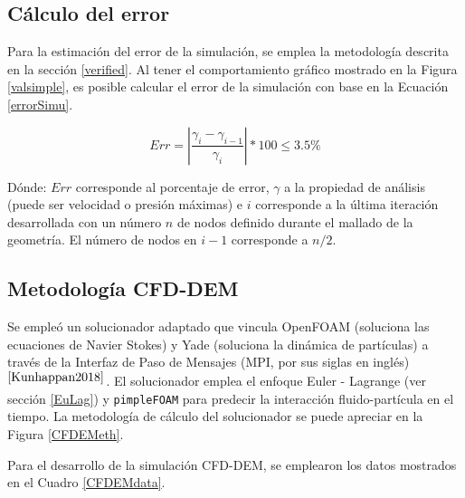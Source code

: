 



\subsection{C\'alculo del error} \label{SimuErr}

\noindent
\justify

Para la estimaci\'on del error de la simulaci\'on, se emplea la metodolog\'ia descrita en la secci\'on \ref{verified}. Al tener el comportamiento gr\'afico mostrado en la Figura \ref{valsimple}, es posible calcular el error de la simulaci\'on con base en la Ecuaci\'on \ref{errorSimu}.

\begin{equation}
	Err = \left| \frac{\gamma _i - \gamma _{i-1}}{\gamma _i} \right| *100 \leq 3.5 \%
	\label{errorSimu}
\end{equation}

\noindent
\justify

D\'onde: $Err$ corresponde al porcentaje de error, $\gamma$ a la propiedad de an\'alisis (puede ser velocidad o presi\'on m\'aximas) e $i$ corresponde a la \'ultima iteraci\'on desarrollada con un n\'umero $n$ de nodos definido durante el mallado de la geometr\'ia. El n\'umero de nodos en $i-1$ corresponde a $n/2$.

\subsection{Metodolog\'ia CFD-DEM}

\noindent
\justify

Se emple\'o un solucionador adaptado que vincula OpenFOAM (soluciona las ecuaciones de Navier Stokes) y Yade (soluciona la din\'amica de part\'iculas) a trav\'es de la Interfaz de Paso de Mensajes (MPI, por sus siglas en ingl\'es)$^{\cite{Kunhappan2018}}$. El solucionador emplea el enfoque Euler - Lagrange (ver secci\'on \ref{EuLag}) y \texttt{pimpleFOAM} para predecir la interacci\'on fluido-part\'icula en el tiempo. La metodolog\'ia de c\'alculo del solucionador se puede apreciar en la Figura \ref{CFDEMeth}.



\noindent
\justify

Para el desarrollo de la simulaci\'on CFD-DEM, se emplearon los datos mostrados en el Cuadro \ref{CFDEMdata}.


